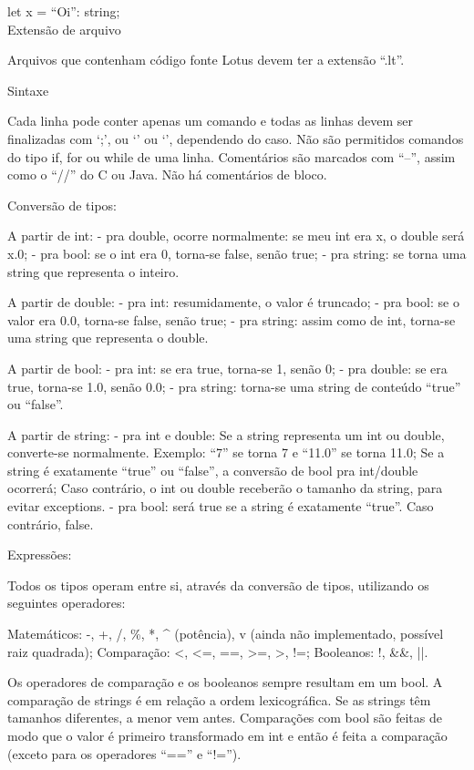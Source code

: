\documentclass[12pt,a4paper]{article}
\begin{document}
let x = ``Oi'': string;\\


Extensão de arquivo

Arquivos que contenham código fonte Lotus devem ter a extensão ``.lt''.


Sintaxe

Cada linha pode conter apenas um comando e todas as linhas devem ser finalizadas com `;', ou `{' ou `}', dependendo do caso. Não são permitidos comandos do tipo if, for ou while de uma linha.
Comentários são marcados com ``--'', assim como o ``//'' do C ou Java. Não há comentários de bloco.


Conversão de tipos:

A partir de int:
- pra double, ocorre normalmente: se meu int era x, o double será x.0;
- pra bool: se o int era 0, torna-se false, senão true;
- pra string: se torna uma string que representa o inteiro.

A partir de double:
- pra int: resumidamente, o valor é truncado;
- pra bool: se o valor era 0.0, torna-se false, senão true;
- pra string: assim como de int, torna-se uma string que representa o double.

A partir de bool:
- pra int: se era true, torna-se 1, senão 0;
- pra double: se era true, torna-se 1.0, senão 0.0;
- pra string: torna-se uma string de conteúdo ``true'' ou ``false''.

A partir de string:
- pra int e double:
Se a string representa um int ou double, converte-se normalmente. Exemplo: ``7'' se torna 7 e ``11.0'' se torna 11.0;
Se a string é exatamente ``true'' ou ``false'', a conversão de bool pra int/double ocorrerá;
Caso contrário, o int ou double receberão o tamanho da string, para evitar exceptions.
- pra bool: será true se a string é exatamente ``true''. Caso contrário, false.


Expressões:

Todos os tipos operam entre si, através da conversão de tipos, utilizando os seguintes operadores:

Matemáticos: -, +, /, \%, *, ^ (potência), v (ainda não implementado, possível raiz quadrada);
Comparação: <, <=, ==, >=, >, !=;
Booleanos: !, &&, ||.

Os operadores de comparação e os booleanos sempre resultam em um bool. A comparação de strings é em relação a ordem lexicográfica. Se as strings têm tamanhos diferentes, a menor vem antes. Comparações com bool são feitas de modo que o valor é primeiro transformado em int e então é feita a comparação (exceto para os operadores ``=='' e ``!='').
\end{document}

